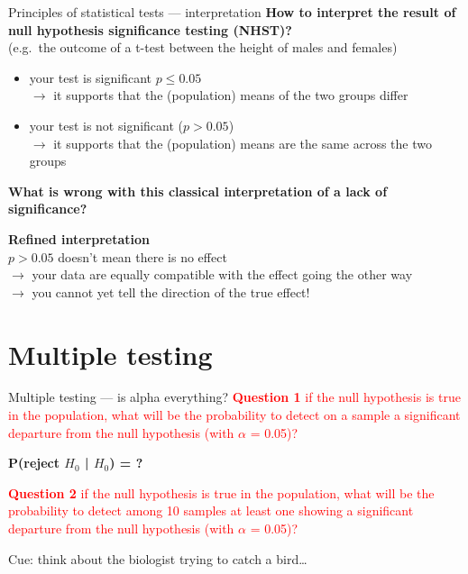 \documentclass[
  ignorenonframetext,
  aspectratio=169,
  t]{beamer}
\newcommand{\bluenorm}[1]{\textcolor{bluebeamer}{#1}}
\newcommand{\bluebold}[1]{\textcolor{bluebeamer}{\textbf{#1}}}
\begin{document}
\begin{frame}{Principles of statistical tests --- interpretation}
\protect{}\label{principles-of-statistical-tests-interpretation-1}
\bluebold{How to interpret the result of null hypothesis significance testing (NHST)?}\\
(e.g.~the outcome of a t-test between the height of males and females)

\begin{itemize}
\item
  your test is significant \(p\leq0.05\)\\
  \(\rightarrow\) it supports that the (population) means of the two
  groups differ
\item
  your test is not significant (\(p>0.05\))\\
  \(\rightarrow\) it supports that the (population) means are the same
  across the two groups
\end{itemize}

\bluebold{What is wrong with this classical interpretation of a lack of significance?}

\begin{callout}
\bluebold{Refined interpretation}\\
$p>0.05$ doesn't mean there is no effect\\
$\rightarrow$ your data are equally compatible with the effect going the other way\\
$\rightarrow$ \bluenorm{you cannot yet tell the direction of the true effect!}
\end{callout}
\end{frame}

\section{Multiple testing}\label{multiple-testing}

\begin{frame}{Multiple testing --- is alpha everything?}
\protect{}\label{multiple-testing-is-alpha-everything}
\textcolor{red}{\textbf{Question 1} if the null hypothesis is true in the population, what will be the probability to detect on a sample a significant departure from the null hypothesis (with $\alpha$ = 0.05)?}

\centering \bluebold{P(reject $H_0$ | $H_0$) = ?}

\raggedright
\vspace{0.5cm}

\pause

\textcolor{red}{\textbf{Question 2} if the null hypothesis is true in the population, what will be the probability to detect among 10 samples at least one showing a significant departure from the null hypothesis (with $\alpha$ = 0.05)?}

\vspace{1cm}

Cue: think about the biologist trying to catch a bird\ldots{}
\end{frame}
\end{document}
